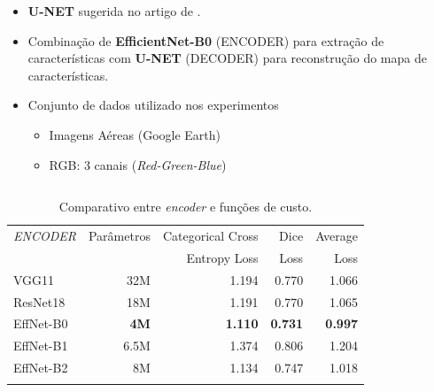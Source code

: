 \documentclass[%
  10pt,%
  aspectratio = 169,%
  compress,%
  t,%
  english,%
  brazilian,%
  tikz,
]{beamer}
\begin{document}
\begin{frame}

\begin{itemize}
    \item \textbf{U-NET} sugerida no artigo de \textbf{\textcite{Khanh2021}}.
    \item Combinação de \textbf{EfficientNet-B0} \cite{EfficientNet} (ENCODER) para extração de características com \textbf{U-NET} \cite{Unet2015} (DECODER) para reconstrução do mapa de características.
    \item Conjunto de dados utilizado nos experimentos
    \begin{itemize}
        \item Imagens Aéreas (Google Earth)
        \item RGB: 3 canais (\textit{Red-Green-Blue})
    \end{itemize}
\end{itemize}

\begin{columns}[T]

\begin{table}[!htb]
\centering%
\caption{Comparativo entre \textit{encoder} e funções de custo.}%
\label{tab:met:unet}
\begin{tabular*}{\columnwidth}{@{\extracolsep{\fill}}lrrrr}
\toprule
\textit{ENCODER}    & Parâmetros    & Categorical Cross & Dice & Average    \\ 
                    &               & Entropy Loss      & Loss & Loss       \\
\midrule
VGG11       & 32M         & 1.194               & 0.770             & 1.066             \\
ResNet18    & 18M         & 1.191               & 0.770             & 1.065             \\
EffNet-B0   & \textbf{4M} & \textbf{1.110}      & \textbf{0.731}    & \textbf{0.997}    \\
EffNet-B1   & 6.5M        & 1.374               & 0.806             & 1.204             \\
EffNet-B2   & 8M          & 1.134               & 0.747             & 1.018             \\
\bottomrule
\addlinespace
\end{tabular*}
\end{table}

\end{columns}
\end{frame}
\end{document}
